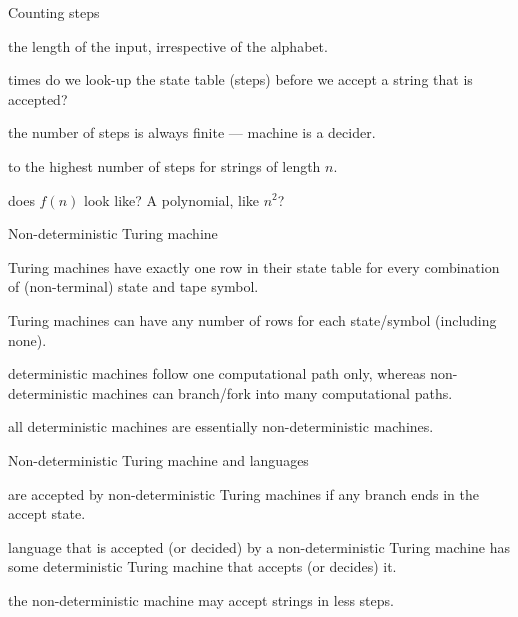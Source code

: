 \begin{frame}{Counting steps}
  \begin{description}
    \setlength\itemsep{6mm}
    \item[$n$] the length of the input, irrespective of the alphabet.
    \item[How many] times do we look-up the state table (steps) before we accept a string that is accepted?
    \item[Assume] the number of steps is always finite --- machine is a decider. 
    \item[Set $f(n)$] to the highest number of steps for strings of length $n$.
    \item[What] does $f(n)$ look like? A polynomial, like $n^2$?
  \end{description}
\end{frame}



\begin{frame}{Non-deterministic Turing machine}
  \begin{description}
    \setlength\itemsep{4mm}
    \item[Deterministic] Turing machines have exactly one row in their state table for every combination of (non-terminal) state and tape symbol.
    \item[Non-deterministic] Turing machines can have any number of rows for each state/symbol (including none).
    \item[Key difference:] deterministic machines follow one computational path only, whereas non-deterministic machines can branch/fork into many computational paths.
    \item[Note:] all deterministic machines are essentially non-deterministic machines. 
  \end{description}
\end{frame}


\begin{frame}{Non-deterministic Turing machine and languages}
  \begin{description}
    \setlength\itemsep{6mm}
    \item[Strings] are accepted by non-deterministic Turing machines if any branch ends in the accept state.
    \item[Any] language that is accepted (or decided) by a non-deterministic Turing machine has some deterministic Turing machine that accepts (or decides) it.
    \item[However,] the non-deterministic machine may accept strings in less steps.
  \end{description}
\end{frame}



